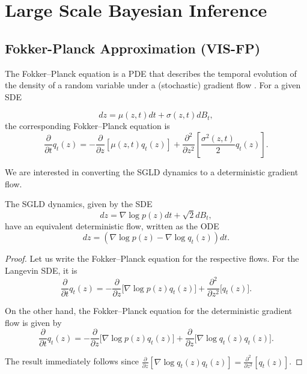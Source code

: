 \chapter{Large Scale Bayesian Inference}

\section{Fokker-Planck Approximation (VIS-FP)}\label{app:fp}
  
  The Fokker--Planck equation is a PDE %
  that describes the temporal evolution of the density of a random variable under a (stochastic) gradient flow \cite{pavliotis2014stochastic}. For a given SDE %
  
$$
dz = \mu(z,t)dt + \sigma(z,t)dB_t,
$$
the corresponding Fokker--Planck equation is
$$
\frac{\partial}{\partial t} q_t(z) = -\frac{\partial}{\partial z}\left[ \mu(z,t)q_t(z)\right] + \frac{\partial^2}{\partial z^2} \left[ \frac{\sigma^2(z,t)}{2} q_t(z) \right].
$$

We are interested in converting the SGLD dynamics to a deterministic gradient flow. %

\begin{Proposition}
The SGLD dynamics, given by the SDE
$$
dz = \nabla \log p(z)dt + \sqrt{2}dB_t,
$$
have an equivalent deterministic flow, written as the ODE %
$$
dz = (\nabla \log p(z) - \nabla \log q_t (z))dt.
$$
\end{Proposition}
\begin{proof}
Let us write the Fokker--Planck equation for the respective flows. For the Langevin SDE, it is 
$$
\frac{\partial}{\partial t} q_t(z) = - \frac{\partial}{\partial z} \bigg[ \nabla \log p(z) q_t(z) \bigg] + \frac{\partial^2}{\partial z^2} \bigg[ q_t(z) \bigg].
$$

On the other hand, the Fokker--Planck equation for the deterministic gradient flow is given by
$$
\frac{\partial}{\partial t} q_t(z) = - \frac{\partial}{\partial z} \bigg[ \nabla \log p(z) q_t(z)\bigg] + \frac{\partial}{\partial z} \bigg[ \nabla \log q_t(z) q_t(z)\bigg].
$$

The result immediately follows since $ \frac{\partial}{\partial z} \left[ \nabla \log q_t(z) q_t(z)\right] = \frac{\partial^2}{\partial z^2} \left[ q_t(z) \right]$.
\end{proof}


